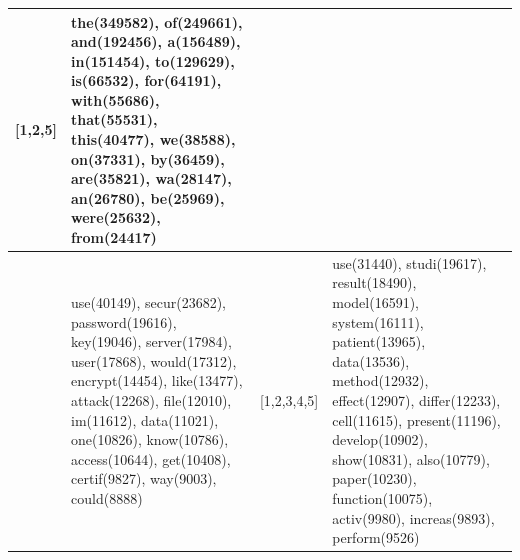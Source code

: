 \documentclass{article}
\begin{document}
\begin{flushleft}
\begin{center}
\begin{tabular}{|p{}|p{}||p{}|p{}|}
[1,2,5] & the(349582), of(249661), and(192456), a(156489), in(151454), to(129629), is(66532), for(64191), with(55686), that(55531), this(40477), we(38588), on(37331), by(36459), are(35821), wa(28147), an(26780), be(25969), were(25632), from(24417)\\
\hline
[1,2,3,4,5] & use(40149), secur(23682), password(19616), key(19046), server(17984), user(17868), would(17312), encrypt(14454), like(13477), attack(12268), file(12010), im(11612), data(11021), one(10826), know(10786), access(10644), get(10408), certif(9827), way(9003), could(8888) &
[1,2,3,4,5] & use(31440), studi(19617), result(18490), model(16591), system(16111), patient(13965), data(13536), method(12932), effect(12907), differ(12233), cell(11615), present(11196), develop(10902), show(10831), also(10779), paper(10230), function(10075), activ(9980), increas(9893), perform(9526)\\
\hline
\end{tabular}
\end{center}
\end{flushleft}
\end{document}
